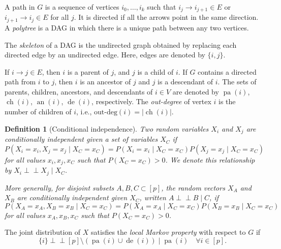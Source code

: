 \documentclass[11pt,a4paper]{article}
\newcommand{\indep}{\perp \!\!\! \perp}  %
\numberwithin{equation}{section}
\newtheorem{definition}[theorem]{Definition}
\DeclareMathOperator{\pa}{pa}
\DeclareMathOperator{\ch}{ch}
\DeclareMathOperator{\an}{an}
\DeclareMathOperator{\de}{de}
\begin{document}
A path in $G$ is a sequence of vertices $i_0, \ldots, i_k$ such that $i_j \to i_{j+1} \in E$ or $i_{j+1} \to i_j \in E$ for all $j$. It is directed if all the arrows point in the same direction. A \emph{polytree} is a DAG in which there is a unique path between any two vertices.

The \emph{skeleton} of a DAG is the undirected graph obtained by replacing each directed edge by an undirected edge. Here, edges are denoted by $\{i,j\}$.

If $i \to j \in E$, then $i$ is a parent of $j$, and $j$ is a child of $i$. If $G$ contains a directed path from $i$ to $j$, then $i$ is an ancestor of $j$ and $j$ is a descendant of $i$. The sets of parents, children, ancestors, and descendants of $i \in V$ are denoted by $\pa(i)$, $\ch(i)$, $\an(i)$, $\de(i)$, respectively. The \emph{out-degree} of vertex $i$ is the number of children of $i$, i.e., $\text{out-deg}(i) = |\ch(i)|$.

\begin{definition}[Conditional independence]
\label{def:conditional_independence}
Two random variables $X_i$ and $X_j$ are \emph{conditionally independent} given a set of variables $X_C$ if
\[
P(X_i = x_i, X_j = x_j \mid X_C = x_C) = P(X_i = x_i \mid X_C = x_C) P(X_j = x_j \mid X_C = x_C)
\]
for all values $x_i, x_j, x_C$ such that $P(X_C = x_C) > 0$. We denote this relationship by $X_i \indep X_j \mid X_C$.

More generally, for disjoint subsets $A, B, C \subset [p]$, the random vectors $X_A$ and $X_B$ are conditionally independent given $X_C$, written $A \indep B \mid C$, if
\[
P(X_A = x_A, X_B = x_B \mid X_C = x_C) = P(X_A = x_A \mid X_C = x_C) P(X_B = x_B \mid X_C = x_C)
\]
for all values $x_A, x_B, x_C$ such that $P(X_C = x_C) > 0$.
\end{definition}


The joint distribution of $X$ satisfies the \emph{local Markov property} with respect to $G$ if
\[
\{i\} \indep [p] \setminus (\pa(i) \cup \de(i)) \mid \pa(i) \quad \forall i \in [p].
\]

\end{document}

